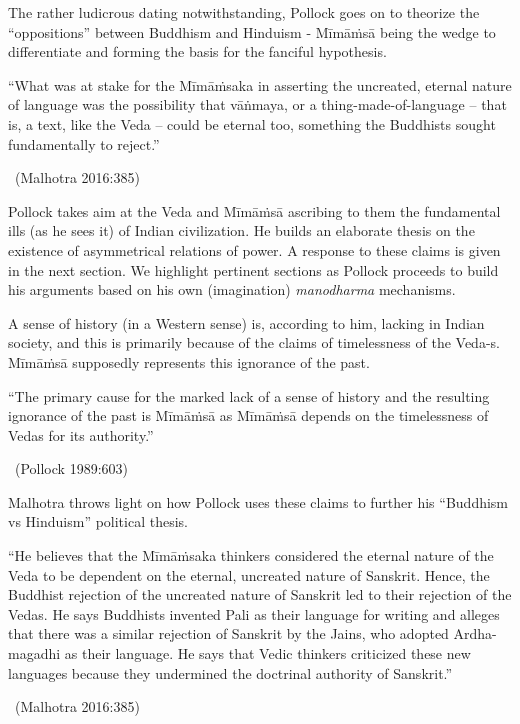 \vskip 3pt

The rather ludicrous dating notwithstanding, Pollock goes on to theorize the “oppositions” between Buddhism and Hinduism - Mīmāṁsā being the wedge to differentiate and forming the basis for the fanciful hypothesis.

\vskip 3pt

\begin{myquote}
“What was at stake for the Mīmāṁsaka in asserting the uncreated, eternal nature of language was the possibility that vāṅmaya, or a thing-made-of-language – that is, a text, like the Veda – could be eternal too, something the Buddhists sought fundamentally to reject.”

~\hfill (Malhotra 2016:385)
\end{myquote}

\vskip 3pt

Pollock takes aim at the Veda and Mīmāṁsā ascribing to them the fundamental ills (as he sees it) of Indian civilization. He builds an elaborate thesis on the existence of asymmetrical relations of power. A response to these claims is given in the next section. We highlight pertinent sections as Pollock proceeds to build his arguments based on his own (imagination) \textit{manodharma} mechanisms.

\vskip 2pt

A sense of history (in a Western sense) is, according to him, lacking in Indian society, and this is primarily because of the claims of timelessness of the Veda-s. Mīmāṁsā supposedly represents this ignorance of the past.

\vskip 2pt

\begin{myquote}
“The primary cause for the marked lack of a sense of history and the resulting ignorance of the past is Mīmāṁsā as Mīmāṁsā depends on the timelessness of Vedas for its authority.”

~\hfill (Pollock 1989:603)
\end{myquote}

\vskip 2pt

Malhotra throws light on how Pollock uses these claims to further his “Buddhism vs Hinduism” political thesis.

\begin{myquote}
“He believes that the Mīmāṁsaka thinkers considered the eternal nature of the Veda to be dependent on the eternal, uncreated nature of Sanskrit. Hence, the Buddhist rejection of the uncreated nature of Sanskrit led to their rejection of the Vedas. He says Buddhists invented Pali as their language for writing and alleges that there was a similar rejection of Sanskrit by the Jains, who adopted Ardha-magadhi as their language. He says that Vedic thinkers criticized these new languages because they undermined the doctrinal authority of Sanskrit.”

~\hfill (Malhotra 2016:385)
\end{myquote}

